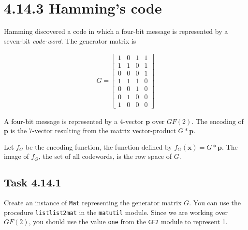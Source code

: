\documentclass[
  letterpaper,
  DIV=11,
  numbers=noendperiod]{scrartcl}
\author{}
\date{}
\renewcommand*\contentsname{Table of contents}
\newcommand\contentsname{Table of contents}
\begin{document}

\newpage

\ifdefined\Shaded\renewenvironment{Shaded}{\begin{tcolorbox}[borderline west={3pt}{0pt}{shadecolor}, sharp corners, interior hidden, enhanced, frame hidden, breakable, boxrule=0pt]}{\end{tcolorbox}}\fi

\renewcommand*\contentsname{Table of contents}
{
\hypersetup{linkcolor=}
\setcounter{tocdepth}{4}
\tableofcontents
}
\newpage{}

\hypertarget{hammings-code}{%
\section{4.14.3 Hamming's code}\label{hammings-code}}

Hamming discovered a code in which a four-bit message is represented by
a seven-bit \emph{code-word}. The generator matrix is

\begin{align*}
G = \begin{bmatrix} 1 & 0 & 1 & 1 \\ 1 & 1 & 0 & 1 \\ 0 & 0 & 0 & 1 \\ 1 & 1 & 1 & 0 \\ 0 & 0 & 1 & 0 \\ 0 & 1 & 0 & 0 \\ 1 & 0 & 0 & 0 \end{bmatrix}
\end{align*}

A four-bit message is represented by a 4-vector \(\bm{p}\) over
\(GF(2)\). The encoding of \(\bm{p}\) is the 7-vector resulting from the
matrix vector-product \(G * \bm{p}\).

Let \(f_G\) be the encoding function, the function defined by
\(f_{G}(\bm{x}) = G * \bm{p}\). The image of \(f_G\), the set of all
codewords, is the row space of \(G\).

\hypertarget{task-4.14.1}{%
\subsection{Task 4.14.1}\label{task-4.14.1}}

Create an instance of \texttt{Mat} representing the generator matrix
\(G\). You can use the procedure \texttt{listlist2mat} in the
\texttt{matutil} module. Since we are working over \(GF(2)\), you should
use the value \texttt{one} from the \texttt{GF2} module to represent 1.
\end{document}
